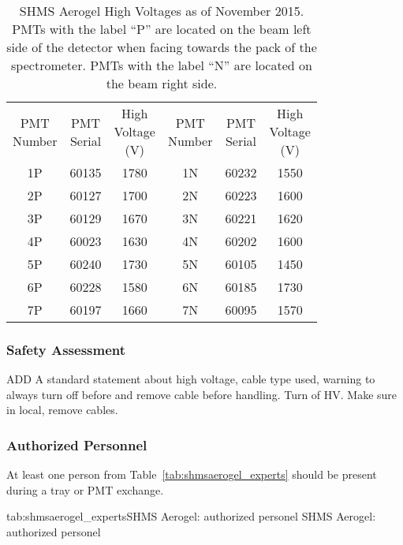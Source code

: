 {\begin{table}
\caption{SHMS Aerogel High Voltages as of November 2015.  PMTs with
  the label ``P'' are located on the beam left side of the detector
  when facing towards the pack of the spectrometer.  PMTs with the
  label ``N'' are located on the beam right side.
\label{tab:shms_aerogelhv}}
\begin{center}
\begin{tabular}{cccccc}
\specialcell{PMT\\Number}&\specialcell{PMT\\Serial}
&\specialcell{High\\Voltage\\(V)}&\specialcell{PMT\\Number}
&\specialcell{PMT\\Serial}&\specialcell{High\\Voltage\\(V)}\\
1P & 60135 & 1780 & 1N & 60232 & 1550\\
2P & 60127 & 1700 & 2N & 60223 & 1600\\
3P & 60129 & 1670 & 3N & 60221 & 1620\\
4P & 60023 & 1630 & 4N & 60202 & 1600\\
5P & 60240 & 1730 & 5N & 60105 & 1450\\
6P & 60228 & 1580 & 6N & 60185 & 1730\\
7P & 60197 & 1660 & 7N & 60095 & 1570\\
\end{tabular}
\end{center}
\end{table}


\begin{safetyen}{0}{0}

\subsubsection{Safety Assessment}

ADD A standard statement about high voltage, cable type used, warning
to always turn off before and remove cable before handling.
Turn of HV.  Make sure in local, remove cables.


\subsubsection{Authorized Personnel}
At least one person from Table~\ref{tab:shmsaerogel_experts} should be
present during a tray or PMT exchange.

\begin{namestab}{tab:shmsaerogel_experts}{SHMS Aerogel: authorized personel}{
    SHMS Aerogel: authorized personel}
  \ArthurMkrtchyan{}
  \TanjaHorn{}
  \VardanTadevosyan{}
  \HamletMkrtchyan{}
\end{namestab}

\end{safetyen}
}%

